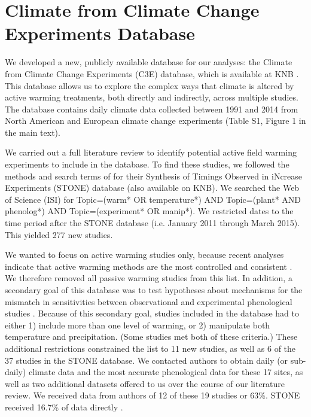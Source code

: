 \documentclass{article}
\begin{document}
\section* {Climate from Climate Change Experiments Database}
\par We developed a new, publicly available database for our analyses: the Climate from Climate Change Experiments (C3E) database, which is available at KNB \citep{ettinger2017}. This database allows us to explore the complex ways that climate is altered by active warming treatments, both directly and indirectly, across multiple studies. The database contains daily climate data collected between 1991 and 2014 from North American and European climate change experiments (Table S1, Figure 1 in the main text). 
 \par We carried out a full literature review to identify potential active field warming experiments to include in the database. To find these studies, we followed the methods and search terms of \citet{wolkovich2012} for their Synthesis of Timings Observed in iNcrease Experiments (STONE) database (also available on KNB). We searched the Web of Science (ISI) for Topic=(warm* OR temperature*) AND Topic=(plant* AND phenolog*) AND Topic=(experiment* OR manip*). We restricted dates to the time period after the STONE database (i.e. January 2011 through March 2015). This yielded 277 new studies. 
 \par We wanted to focus on active warming studies only, because recent analyses indicate that active warming methods are the most controlled and consistent \citep{kimball2005,kimball2008,aronson2009,wolkovich2012}. We therefore removed all passive warming studies from this list. In addition, a secondary goal of this database was to test hypotheses about mechanisms for the mismatch in sensitivities between observational and experimental phenological studies \citep{wolkovich2012}. Because of this secondary goal, studies included in the database had to either 1) include more than one level of warming, or 2) manipulate both temperature and precipitation. (Some studies met both of these criteria.) These additional restrictions constrained the list to 11 new studies, as well as 6 of the 37 studies in the STONE database. We contacted authors to obtain daily (or sub-daily) climate data and the most accurate phenological data for these 17 sites, as well as two additional datasets offered to us over the course of our literature review.  We received data from authors of 12 of these 19 studies or 63\%. STONE received 16.7\% of data directly \citep{wolkovich2012}.
\end{document}

